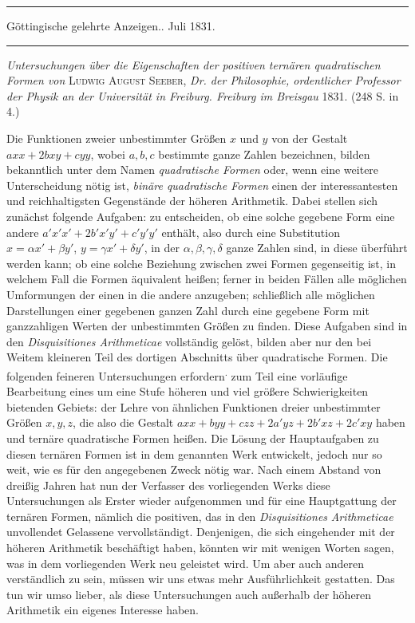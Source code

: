 \begin{center}
\rule{.86\linewidth}{.3pt}\par
Göttingische gelehrte Anzeigen.. Juli 1831.\par
\rule{.86\linewidth}{.3pt}
\end{center}
\emph{Untersuchungen über die Eigenschaften der positiven ternären quadratischen Formen von} \textsc{Ludwig August Seeber}, \emph{Dr. der Philosophie, ordentlicher Professor der Physik an der Universität in Freiburg. Freiburg im Breisgau} 1831. (248 S. in 4.)

Die Funktionen zweier unbestimmter Größen $x$ und $y$ von der Gestalt $axx+2bxy+cyy$, wobei $a,b,c$ bestimmte ganze Zahlen bezeichnen, bilden bekanntlich unter dem Namen \emph{quadratische Formen} oder, wenn eine weitere Unterscheidung nötig ist, \emph{binäre quadratische Formen} einen der interessantesten und reichhaltigsten Gegenstände der höheren Arithmetik. Dabei stellen sich zunächst folgende Aufgaben: zu entscheiden, ob eine solche gegebene Form eine andere $a'x'x'+2b'x'y'+c'y'y'$ enthält, also durch eine Substitution $x=\alpha x'+\beta y'$, $y=\gamma x'+\delta y'$, in der $\alpha,\beta,\gamma,\delta$ ganze Zahlen sind, in diese überführt werden kann; ob eine solche Beziehung zwischen zwei Formen gegenseitig ist, in welchem Fall die Formen äquivalent heißen; ferner in beiden Fällen alle möglichen Umformungen der einen in die andere anzugeben; schließlich alle möglichen Darstellungen einer gegebenen ganzen Zahl durch eine gegebene Form mit ganzzahligen Werten der unbestimmten Größen zu finden. Diese Aufgaben sind in den \emph{Disquisitiones Arithmeticae} vollständig gelöst, bilden aber nur den bei Weitem kleineren Teil des dortigen Abschnitts über quadratische Formen. Die folgenden feineren Untersuchungen erfordern\textsuperscript{.} zum Teil eine vorläufige Bearbeitung eines um eine Stufe höheren und viel größere Schwierigkeiten bietenden Gebiets: der Lehre von ähnlichen Funktionen dreier unbestimmter Größen $x,y,z$, die also die Gestalt $axx+byy+czz+2a'yz+2b'xz+2c'xy$ haben und ternäre quadratische Formen heißen. Die Lösung der Hauptaufgaben zu diesen ternären Formen ist in dem genannten Werk entwickelt, jedoch nur so weit, wie es für den angegebenen Zweck nötig war. Nach einem Abstand von dreißig Jahren hat nun der Verfasser des vorliegenden Werks diese Untersuchungen als Erster wieder aufgenommen und für eine Hauptgattung der ternären Formen, nämlich die positiven, das in den \emph{Disquisitiones }
\emph{Arithmeticae} unvollendet Gelassene vervollständigt. Denjenigen, die sich eingehender mit der höheren Arithmetik beschäftigt haben, könnten wir mit wenigen Worten sagen, was in dem vorliegenden Werk neu geleistet wird. Um aber auch anderen verständlich zu sein, müssen wir uns etwas mehr Ausführlichkeit gestatten. Das tun wir umso lieber, als diese Untersuchungen auch außerhalb der höheren Arithmetik ein eigenes Interesse haben.

